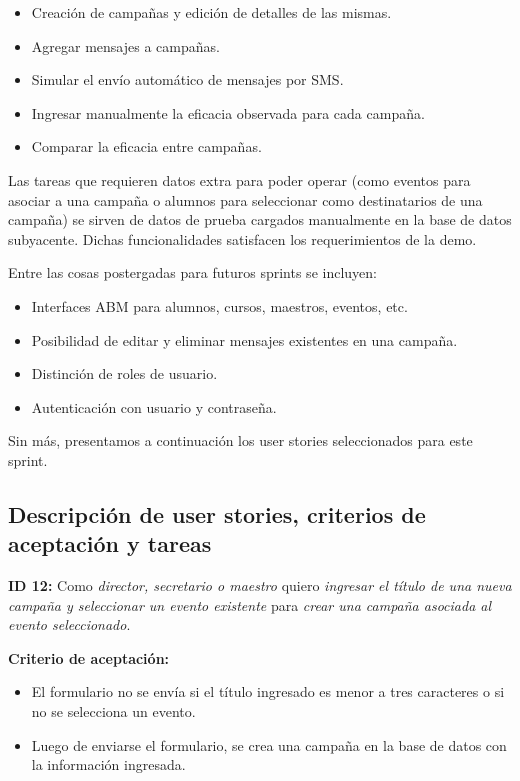 \documentclass[a4paper, 10pt, twoside]{article}
\newcommand{\sprintstory}[4]{
  \noindent
  \textbf{ID #1:} Como \emph{#2} quiero \emph{#3} para \emph{#4}.
}
\newenvironment{criterios}{
  \textbf{Criterio de aceptación:}
  \begin{itemize}
}{
  \end{itemize}
}
\newcommand{\criterio}[1] {
  \item #1
}
\begin{document}
\begin{itemize}
  \item Creación de campañas y edición de detalles de las mismas.
  \item Agregar mensajes a campañas.
  \item Simular el envío automático de mensajes por SMS.
  \item Ingresar manualmente la eficacia observada para cada campaña.
  \item Comparar la eficacia entre campañas.
\end{itemize}

Las tareas que requieren datos extra para poder operar (como eventos para asociar a una campaña o alumnos para seleccionar como destinatarios de una campaña) se sirven de datos de prueba cargados manualmente en la base de datos subyacente. Dichas funcionalidades satisfacen los requerimientos de la demo.

Entre las cosas postergadas para futuros sprints se incluyen:

\begin{itemize}
  \item Interfaces ABM para alumnos, cursos, maestros, eventos, etc.
  \item Posibilidad de editar y eliminar mensajes existentes en una campaña.
  \item Distinción de roles de usuario.
  \item Autenticación con usuario y contraseña.
\end{itemize}

Sin más, presentamos a continuación los user stories seleccionados para este sprint.


\subsection{Descripción de user stories, criterios de aceptación y tareas}

\sprintstory{12}
            {director, secretario o maestro}
            {ingresar el título de una nueva campaña y seleccionar un evento existente}
            {crear una campaña asociada al evento seleccionado}

\begin{criterios}
  \criterio{El formulario no se envía si el título ingresado es menor a tres caracteres o si no se selecciona un evento.}
  \criterio{Luego de enviarse el formulario, se crea una campaña en la base de datos con la información ingresada.}
\end{criterios}
\end{document}
